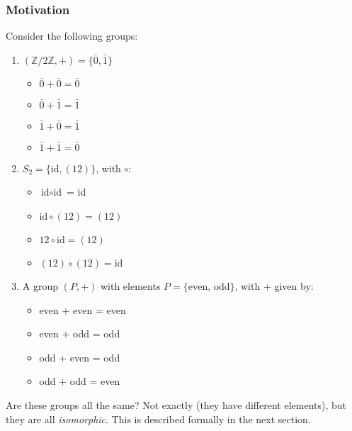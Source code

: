 \documentclass{article}
\theoremstyle{plain}
\newcommand{\Z}{\mathbb{Z}}
\begin{document}
\subsubsection{Motivation}
Consider the following groups:
\begin{enumerate}[1.]
\item $(\Z/2\Z,+) = \{\bar{0}, \bar{1}\}$
\begin{multicols}{2}
\begin{itemize}
\item $\bar{0}+\bar{0}=\bar{0}$
\item $\bar{0}+\bar{1}=\bar{1}$
\end{itemize}
\begin{itemize}
\item $\bar{1}+\bar{0}=\bar{1}$
\item $\bar{1}+\bar{1}=\bar{0}$
\end{itemize}
\end{multicols}
\item $S_2 = \{ \text{id}, (12) \}$, with $\circ$:
\begin{multicols}{2}
\begin{itemize}
\item $\text{id}\circ\text{id}$ = id
\item $\text{id}\circ(12) = (12)$
\end{itemize}
\begin{itemize}
\item $12\circ\text{id}=(12)$
\item $(12)\circ(12)=\text{id}$
\end{itemize}
\end{multicols}
\item A group $(P,+)$ with elements $P = \{\text{even, odd}\}$, with $+$ given by:
\begin{multicols}{2}
\begin{itemize}
\item even + even = even
\item even + odd = odd
\end{itemize}
\begin{itemize}
\item odd + even = odd
\item odd + odd = even
\end{itemize}
\end{multicols}
\end{enumerate}
Are these groups all the same? Not exactly (they have different elements), but they are all \textit{isomorphic}. This is described formally in the next section.
\end{document}
